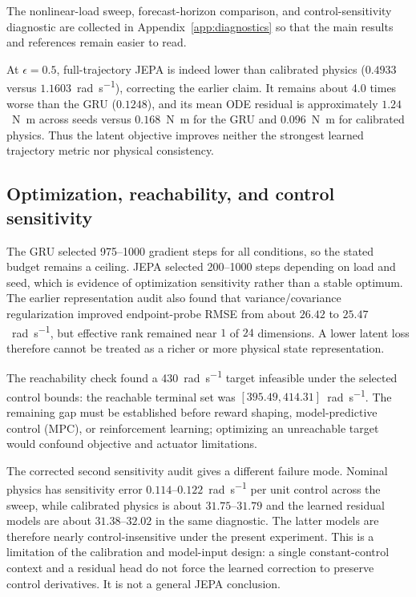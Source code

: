 \documentclass[10pt,journal]{IEEEtran}
\begin{document}
The nonlinear-load sweep, forecast-horizon comparison, and control-sensitivity diagnostic are collected in Appendix~\ref{app:diagnostics} so that the main results and references remain easier to read.

At $\epsilon=0.5$, full-trajectory JEPA is indeed lower than calibrated physics ($0.4933$ versus $1.1603$~\si{\radian\per\second}), correcting the earlier claim. It remains about 4.0 times worse than the GRU ($0.1248$), and its mean ODE residual is approximately $1.24$~\si{\newton\metre} across seeds versus $0.168$~\si{\newton\metre} for the GRU and $0.096$~\si{\newton\metre} for calibrated physics. Thus the latent objective improves neither the strongest learned trajectory metric nor physical consistency.

\subsection{Optimization, reachability, and control sensitivity}
The GRU selected 975--1000 gradient steps for all conditions, so the stated budget remains a ceiling. JEPA selected 200--1000 steps depending on load and seed, which is evidence of optimization sensitivity rather than a stable optimum. The earlier representation audit also found that variance/covariance regularization improved endpoint-probe RMSE from about $26.42$ to $25.47$~\si{\radian\per\second}, but effective rank remained near $1$ of $24$ dimensions. A lower latent loss therefore cannot be treated as a richer or more physical state representation.

The reachability check found a 430~\si{\radian\per\second} target infeasible under the selected control bounds: the reachable terminal set was $[395.49,414.31]$~\si{\radian\per\second}. The remaining gap must be established before reward shaping, model-predictive control (MPC), or reinforcement learning; optimizing an unreachable target would confound objective and actuator limitations.

The corrected second sensitivity audit gives a different failure mode. Nominal physics has sensitivity error $0.114$--$0.122$~\si{\radian\per\second} per unit control across the sweep, while calibrated physics is about $31.75$--$31.79$ and the learned residual models are about $31.38$--$32.02$ in the same diagnostic. The latter models are therefore nearly control-insensitive under the present experiment. This is a limitation of the calibration and model-input design: a single constant-control context and a residual head do not force the learned correction to preserve control derivatives. It is not a general JEPA conclusion.
\end{document}
